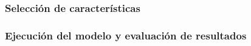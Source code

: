 


\subsubsection{Selección de características}





\subsubsection{Ejecución del modelo y evaluación de resultados}






\vspace{3mm}

